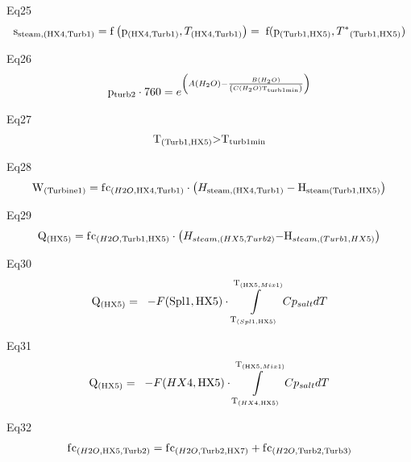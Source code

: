 \documentclass[10pt,a4paper]{article}
\begin{document}
Eq25
\begin{align}
	{{\rm{s}}_{{\rm{steam,}}\left( {{\rm{HX4}},{\rm{Turb1}}} \right)}} = {\rm{f}}\left( {{{\rm{p}}_{\left( {{\rm{HX4}},{\rm{Turb1}}} \right)}},{T_{\left( {{\rm{HX4,Turb1}}} \right)}}} \right) = \;{\rm{f}}({{\rm{p}}_{\left( {{\rm{Turb1}},{\rm{HX5}}} \right)}},{T^*}_{\left( {{\rm{Turb1}},{\rm{HX5}}} \right)})
\end{align}

Eq26
\begin{align}
	{{\rm{p}}_{{\rm{turb2}}}}\cdot{\rm{76}}0{\rm{ }} = {e^{\left( {A\left( {{H_2}O} \right) - \frac{{B\left( {{H_2}O} \right)}}{{\left( {C\left( {{H_2}O} \right){{\rm{T}}_{{\rm{turb1min}}}}} \right)}}} \right)}}
\end{align}

Eq27
\begin{align}
	{{\rm{T}}_{\left( {{\rm{Turb1}},{\rm{HX5}}} \right)}}{\rm{ > }}{{\rm{T}}_{{\rm{turb1min}}}}
\end{align}

Eq28
\begin{align}
	{{\rm{W}}_{\left( {{\rm{Turbine1}}} \right){\rm{ }}}} = {\rm{ f}}{{\rm{c}}_{\left( {H2O,{\rm{HX4}},{\rm{Turb1}}} \right)}}\cdot\left( {{H_{{\rm{steam,}}\left( {{\rm{HX4}},{\rm{Turb1}}} \right)}} - {{\rm{H}}_{{\rm{steam}}\left( {{\rm{Turb1}},{\rm{HX5}}} \right)}}} \right)	
\end{align}

Eq29
\begin{align}
	{{\rm{Q}}_{\left( {{\rm{HX5}}} \right)}}{\rm{ }} = {\rm{ f}}{{\rm{c}}_{\left( {H2O,{\rm{Turb1}},{\rm{HX5}}} \right)}}\cdot\left( {{H_{steam,(HX5,Turb2)}}{\rm{ - }}{{\rm{H}}_{steam,(Turb1,HX5)}}} \right)
\end{align}

Eq30
\begin{align}
	{{\rm{Q}}_{\left( {{\rm{HX5}}} \right)}}{\rm{ }} = \;\; - F({\rm{Spl1}},{\rm{HX5}})\cdot\int\limits_{{{\rm{T}}_{(Spl1,{\rm{HX5)}}}}}^{{{\rm{T}}_{{\rm{(HX5}},Mix1)}}} {C{p_{salt}}dT}
\end{align}

Eq31
\begin{align}
	{{\rm{Q}}_{\left( {{\rm{HX5}}} \right)}}{\rm{ }} = \;\; - F(HX4,{\rm{HX5}})\cdot\int\limits_{{{\rm{T}}_{(HX4,{\rm{HX5)}}}}}^{{{\rm{T}}_{{\rm{(HX5}},Mix1)}}} {C{p_{salt}}dT}
\end{align}

Eq32
\begin{align}
	{\rm{f}}{{\rm{c}}_{\left( {H2O,{\rm{HX5}},{\rm{Turb2}}} \right){\rm{ }}}} = {\rm{ f}}{{\rm{c}}_{\left( {H2O,{\rm{Turb2}},{\rm{HX7}}} \right)}} + {\rm{f}}{{\rm{c}}_{\left( {H2O,{\rm{Turb2}},{\rm{Turb3}}} \right)}}
\end{align}
\end{document}
